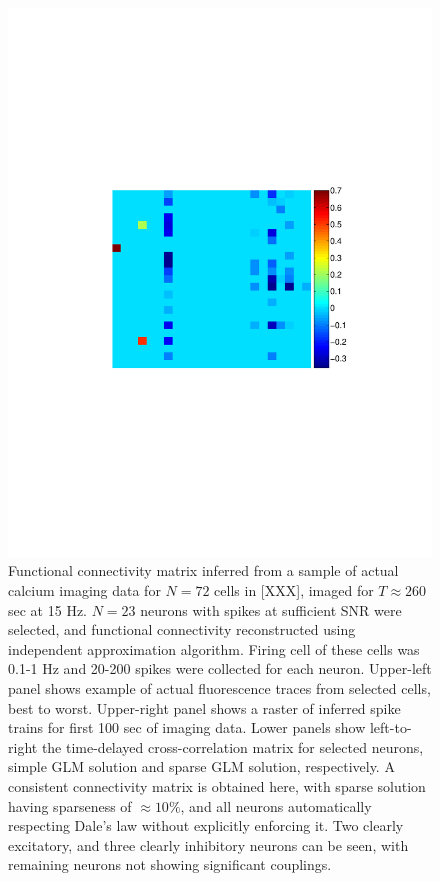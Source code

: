 \begin{figure}[h]
\begin{minipage}[c]{0.3\hsize}
\includegraphics[width=\hsize]{../figs/FigureA11_real_sparse}
\end{minipage}
\caption{Functional connectivity matrix inferred from a sample of actual calcium imaging data for $N=72$ cells in [XXX], imaged for $T\approx 260$ sec at 15 Hz. 
$N=23$ neurons with spikes at sufficient SNR were selected, and functional connectivity reconstructed using independent approximation algorithm. Firing cell of these cells was 0.1-1 Hz and 20-200 spikes were collected for each neuron.
Upper-left panel shows example of actual fluorescence traces from selected cells, best to worst. Upper-right panel shows a raster of inferred spike trains for first 100 sec of imaging data. Lower panels show left-to-right the time-delayed cross-correlation matrix for selected neurons, simple GLM solution and sparse GLM solution, respectively. A consistent connectivity matrix is obtained here, with sparse solution having sparseness of $\approx 10 \%$, and all neurons automatically respecting Dale's law without explicitly enforcing it. Two clearly excitatory, and three clearly inhibitory neurons can be seen, with remaining neurons not showing significant couplings.}
\label{fig:real}
\end{figure}


